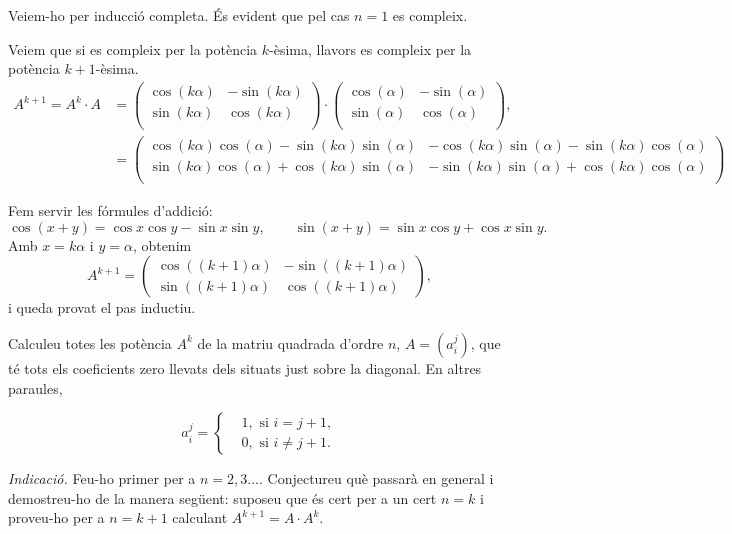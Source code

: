 \begin{solution}
Veiem-ho per inducció completa. És evident que pel cas $n=1$ es compleix.

Veiem que si es compleix per la potència $k$-èsima, llavors es compleix per la potència $k+1$-èsima.
\begin{align}
    A^{k+1}= A^k\cdot A &= 
    \begin{pmatrix}
            \cos(k\alpha) & -\sin(k\alpha)\\
    \sin(k\alpha) & \cos(k\alpha)\\
    \end{pmatrix}\cdot \begin{pmatrix}
    \cos(\alpha) & -\sin(\alpha)\\
    \sin(\alpha) & \cos(\alpha)\\ 
\end{pmatrix},\\
&=\begin{pmatrix}
    \cos(k\alpha) \cos(\alpha)-\sin(k\alpha)\sin(\alpha) & -\cos(k\alpha)\sin(\alpha)-\sin(k\alpha)\cos(\alpha)\\
\sin(k\alpha)\cos(\alpha)+\cos(k\alpha)\sin(\alpha) & -\sin(k\alpha) \sin(\alpha)+\cos(k\alpha)\cos(\alpha)\\
\end{pmatrix}
\end{align}

Fem servir les fórmules d’addició:
\[
\cos(x+y)=\cos x\cos y-\sin x\sin y,
\qquad
\sin(x+y)=\sin x\cos y+\cos x\sin y.
\]
Amb $x=k\alpha$ i $y=\alpha$, obtenim
\[
A^{k+1}=
\begin{pmatrix}
\cos((k+1)\alpha) & -\sin((k+1)\alpha)\\
\sin((k+1)\alpha) & \cos((k+1)\alpha)
\end{pmatrix},
\]
i queda provat el pas inductiu.

\end{solution}
\newpage
\begin{exercise}[1.8.2]
Calculeu totes les potència $A^k$ de la matriu quadrada d'ordre $n$, $A=(a^j_i)$, que té tots els coeficients zero llevats dels situats just sobre la diagonal. En altres paraules,

\[
a^j_i = \left\{\begin{aligned}
    &1, \text{ si } i = j+1,\\
    &0, \text{ si } i \neq j+1.
\end{aligned}\right.
\]

\textit{Indicació.} Feu-ho primer per a $n=2,3...$. Conjectureu què passarà en general i demostreu-ho de la manera següent: suposeu que és cert per a un cert $n=k$ i proveu-ho per a $n=k+1$ calculant $A^{k+1} = A\cdot A^k.$
\end{exercise}

